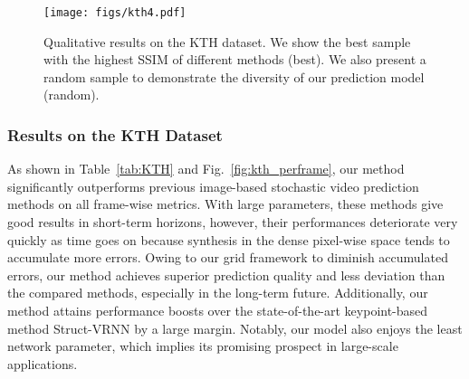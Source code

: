 \documentclass[letterpaper, 10 pt, conference]{ieeeconf}
\begin{document}
\begin{table}[t]
	\centering
	\caption{Average comparison results of different methods on the KTH dataset. 
		The best results are marked in bold.
	}
	\label{tab:KTH}
	\vspace{-4mm}
\end{table}

\begin{figure*}[t]
	\texttt{[image: figs/kth4.pdf]}
	\centering
	\caption{Qualitative results on the KTH dataset. We show the best sample with the highest SSIM of different methods (best). We also present a random sample to demonstrate the diversity of our prediction model (random).
	}
	\label{fig:Qualitative_kth}
	\vspace{-4mm}
\end{figure*}

\subsubsection{Results on the KTH Dataset}
As shown in Table~\ref{tab:KTH} and Fig.~\ref{fig:kth_perframe}, our method significantly outperforms previous image-based stochastic video prediction methods on all frame-wise metrics. 
With large parameters, these methods give good results in short-term horizons, however, their performances deteriorate very quickly as time goes on because synthesis in the dense pixel-wise space tends to accumulate more errors.
Owing to our grid framework to diminish accumulated errors, our method achieves superior prediction quality and less deviation than the compared methods, especially in the long-term future. Additionally, our method attains performance boosts over the state-of-the-art keypoint-based method Struct-VRNN by a large margin.
Notably, our model also enjoys the least network parameter, which implies its promising prospect in large-scale applications.
\end{document}
